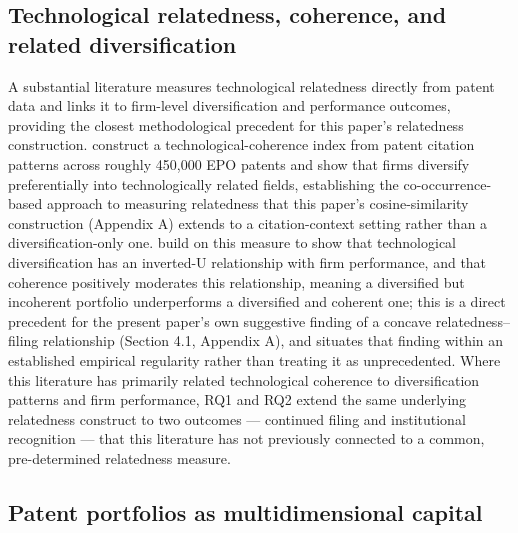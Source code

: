 \documentclass[12pt]{article}
\begin{document}
\subsection{Technological relatedness, coherence, and related diversification}

A substantial literature measures technological relatedness directly from patent data and links it to firm-level diversification and performance outcomes, providing the closest methodological precedent for this paper's relatedness construction. \citet{breschi2003} construct a technological-coherence index from patent citation patterns across roughly 450,000 EPO patents and show that firms diversify preferentially into technologically related fields, establishing the co-occurrence-based approach to measuring relatedness that this paper's cosine-similarity construction (Appendix A) extends to a citation-context setting rather than a diversification-only one. \citet{leten2007} build on this measure to show that technological diversification has an inverted-U relationship with firm performance, and that coherence positively moderates this relationship, meaning a diversified but incoherent portfolio underperforms a diversified and coherent one; this is a direct precedent for the present paper's own suggestive finding of a concave relatedness--filing relationship (Section 4.1, Appendix A), and situates that finding within an established empirical regularity rather than treating it as unprecedented. Where this literature has primarily related technological coherence to diversification patterns and firm performance, RQ1 and RQ2 extend the same underlying relatedness construct to two outcomes --- continued filing and institutional recognition --- that this literature has not previously connected to a common, pre-determined relatedness measure.

\subsection{Patent portfolios as multidimensional capital}
\end{document}
